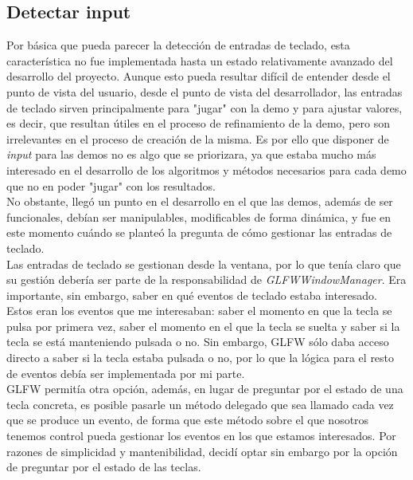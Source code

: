 \subsection{Detectar input}

Por básica que pueda parecer la detección de entradas de teclado, esta característica no fue implementada hasta un estado relativamente avanzado del desarrollo del proyecto. Aunque esto pueda resultar difícil de entender desde el punto de vista del usuario, desde el punto de vista del desarrollador, las entradas de teclado sirven principalmente para "jugar" con la demo y para ajustar valores, es decir, que resultan útiles en el proceso de refinamiento de la demo, pero son irrelevantes en el proceso de creación de la misma. Es por ello que disponer de \emph{input} para las demos no es algo que se priorizara, ya que estaba mucho más interesado en el desarrollo de los algoritmos y métodos necesarios para cada demo que no en poder "jugar" con los resultados.\\

No obstante, llegó un punto en el desarrollo en el que las demos, además de ser funcionales, debían ser manipulables, modificables de forma dinámica, y fue en este momento cuándo se planteó la pregunta de cómo gestionar las entradas de teclado.\\

Las entradas de teclado se gestionan desde la ventana, por lo que tenía claro que su gestión debería ser parte de la responsabilidad de \emph{GLFWWindowManager}. Era importante, sin embargo, saber en qué eventos de teclado estaba interesado.\\

Estos eran los eventos que me interesaban: saber el momento en que la tecla se pulsa por primera vez, saber el momento en el que la tecla se suelta y saber si la tecla se está manteniendo pulsada o no. Sin embargo, GLFW sólo daba acceso directo a saber si la tecla estaba pulsada o no, por lo que la lógica para el resto de eventos debía ser implementada por mi parte.\\

GLFW permitía otra opción, además, en lugar de preguntar por el estado de una tecla concreta, es posible pasarle un método delegado que sea llamado cada vez que se produce un evento, de forma que este método sobre el que nosotros tenemos control pueda gestionar los eventos en los que estamos interesados. Por razones de simplicidad y mantenibilidad, decidí optar sin embargo por la opción de preguntar por el estado de las teclas.\\

